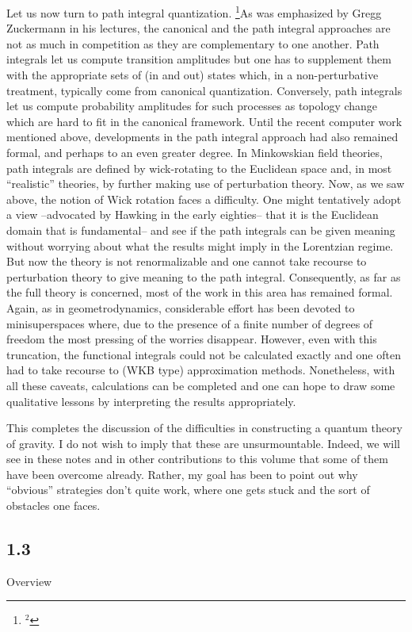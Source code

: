 Let us now turn to path integral quantization.%
\footnote{$^2$}{As was emphasized by Gregg Zuckermann in his lectures, the
canonical and the path integral approaches are not as much in competition
as they are complementary to one another. Path integrals let us compute
transition amplitudes but one has to supplement them with the appropriate
sets of (in and out) states which, in a non-perturbative treatment,
typically come from canonical quantization. Conversely, path integrals let
us compute probability amplitudes for such processes as topology change
which are hard to fit in the canonical framework.}
Until the recent computer work mentioned above, developments in the path
integral approach had also remained formal,
and perhaps to an even greater degree. In Minkowskian field theories,
path integrals are defined by wick-rotating to the Euclidean space and,
in most ``realistic'' theories, by further making use of perturbation theory.
Now, as we saw above, the notion of Wick rotation faces a difficulty. One
might tentatively adopt a view --advocated by Hawking in the early eighties--
that it is the Euclidean domain that is fundamental-- and see if the path
integrals can be given meaning without worrying about what the results might
imply in the Lorentzian regime. But now the theory is not renormalizable
and one cannot take recourse to  perturbation theory to give meaning to
the path integral. Consequently, as far as the full theory is concerned, most
of the work in this area has remained formal. Again, as in geometrodynamics,
considerable effort has been devoted to minisuperspaces where, due to the
presence of a finite number of degrees of freedom the most pressing of the
worries disappear. However, even with this truncation, the functional
integrals could not be calculated exactly and one often had to take recourse
to (WKB type) approximation methods. Nonetheless, with all these caveats,
calculations can be completed and one can hope to draw some qualitative
lessons by interpreting the results appropriately.
\medskip

This completes the discussion of the difficulties in constructing a quantum
theory of gravity. I do not wish to imply that these are unsurmountable.
Indeed, we will see in these notes and in other contributions to this volume
that some of them have been overcome already. Rather, my goal has been to
point out why ``obvious'' strategies don't quite work, where one gets stuck
and the sort of obstacles one faces.

\goodbreak
\subsection{1.3}{Overview}

